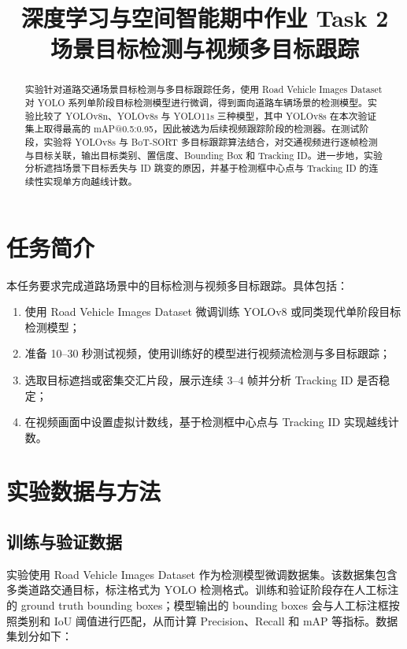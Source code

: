 \documentclass[UTF8,a4paper,12pt]{ctexart}
\title{深度学习与空间智能期中作业 Task 2\\场景目标检测与视频多目标跟踪}
\begin{document}
\maketitle

\begin{abstract}
实验针对道路交通场景目标检测与多目标跟踪任务，使用 Road Vehicle Images Dataset 对 YOLO 系列单阶段目标检测模型进行微调，得到面向道路车辆场景的检测模型。实验比较了 YOLOv8n、YOLOv8s 与 YOLO11s 三种模型，其中 YOLOv8s 在本次验证集上取得最高的 mAP@0.5:0.95，因此被选为后续视频跟踪阶段的检测器。在测试阶段，实验将 YOLOv8s 与 BoT-SORT 多目标跟踪算法结合，对交通视频进行逐帧检测与目标关联，输出目标类别、置信度、Bounding Box 和 Tracking ID。进一步地，实验分析遮挡场景下目标丢失与 ID 跳变的原因，并基于检测框中心点与 Tracking ID 的连续性实现单方向越线计数。
\end{abstract}

\section{任务简介}

本任务要求完成道路场景中的目标检测与视频多目标跟踪。具体包括：
\begin{enumerate}[label=(\arabic*)]
    \item 使用 Road Vehicle Images Dataset 微调训练 YOLOv8 或同类现代单阶段目标检测模型；
    \item 准备 10--30 秒测试视频，使用训练好的模型进行视频流检测与多目标跟踪；
    \item 选取目标遮挡或密集交汇片段，展示连续 3--4 帧并分析 Tracking ID 是否稳定；
    \item 在视频画面中设置虚拟计数线，基于检测框中心点与 Tracking ID 实现越线计数。
\end{enumerate}

\section{实验数据与方法}

\subsection{训练与验证数据}

实验使用 Road Vehicle Images Dataset 作为检测模型微调数据集。该数据集包含多类道路交通目标，标注格式为 YOLO 检测格式。训练和验证阶段存在人工标注的 ground truth bounding boxes；模型输出的 bounding boxes 会与人工标注框按照类别和 IoU 阈值进行匹配，从而计算 Precision、Recall 和 mAP 等指标。数据集划分如下：
\end{document}
